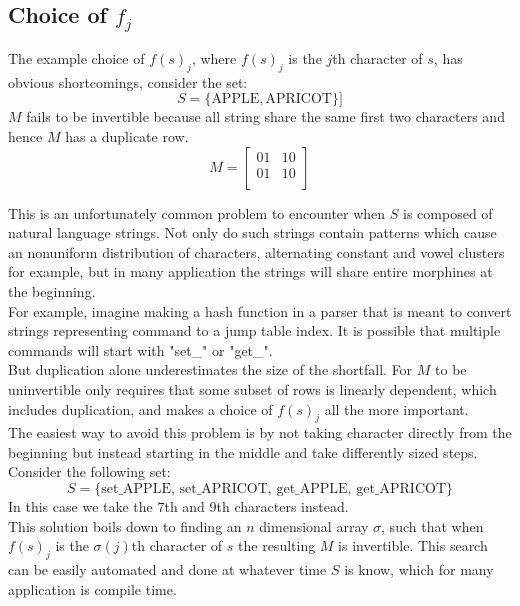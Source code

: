 \subsection{Choice of $f_j$}
The example choice of $f(s)_j$,
where $f(s)_j$ is the $j$th character of $s$, has obvious shortcomings, consider the set:
\[S = \{\text{APPLE},\text{APRICOT}\}]\]
$M$ fails to be invertible because all string share the same first two characters and hence $M$ has a duplicate row. 
\[
M = \begin{bmatrix}
	01&10\\
	01&10\\
\end{bmatrix}
\]

This is an unfortunately common problem to encounter when $S$ is composed of natural language strings.
Not only do such strings contain patterns which cause an nonuniform distribution of characters,
alternating constant and vowel clusters for example,
but in many application the strings will share entire morphines at the beginning.
\\

For example, 
imagine making a hash function in a parser that is meant to convert strings representing command to a jump table index.
It is possible that multiple commands will start with "set\_" or "get\_".
\\

But duplication alone underestimates the size of the shortfall.
For $M$ to be uninvertible only requires that some subset of rows is linearly dependent,
which includes duplication,
and makes a choice of $f(s)_j$ all the more important.
\\

The easiest way to avoid this problem is by not taking character directly from the beginning but instead starting in the middle and take differently sized steps.
Consider the following set:
\[S = \{\text{set\_APPLE},\,\text{set\_APRICOT},\,\text{get\_APPLE},\,\text{get\_APRICOT}\}\]
In this case we take the $7$th and $9$th characters instead.
\\

This solution boils down to finding an $n$ dimensional array $\sigma$,
such that when $f(s)_j$ is the $\sigma(j)$th character of $s$ the resulting $M$ is invertible.
This search can be easily automated and done at whatever time $S$ is know,
which for many application is compile time.
